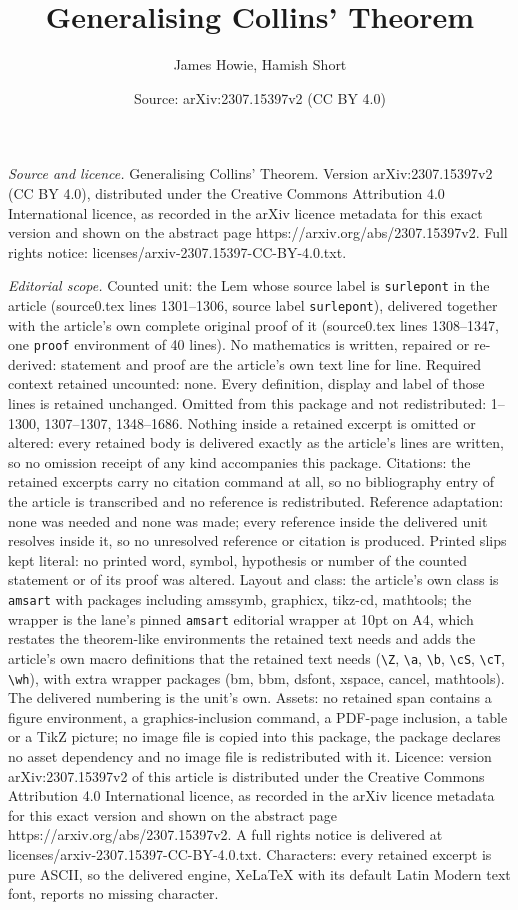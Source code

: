 \documentclass[10pt,a4paper]{amsart}
\title[Generalising Collins' Theorem]{Generalising Collins' Theorem}
\author{James Howie, Hamish Short}
\date{Source: arXiv:2307.15397v2 (CC BY 4.0)}
\begin{document}
\maketitle

\noindent\emph{Source and licence.} Generalising Collins' Theorem. Version arXiv:2307.15397v2 (CC BY 4.0), distributed under the Creative Commons Attribution 4.0 International licence, as recorded in the arXiv licence metadata for this exact version and shown on the abstract page https://arxiv.org/abs/2307.15397v2. Full rights notice: licenses/arxiv-2307.15397-CC-BY-4.0.txt.\par\smallskip

\noindent\textit{Editorial scope.} Counted unit: the Lem whose source label is \texttt{surlepont} in the article (source0.tex lines 1301--1306, source label \texttt{surlepont}), delivered together with the article's own complete original proof of it (source0.tex lines 1308--1347, one \texttt{proof} environment of 40 lines). No mathematics is written, repaired or re-derived: statement and proof are the article's own text line for line. Required context retained uncounted: none. Every definition, display and label of those lines is retained unchanged. Omitted from this package and not redistributed: 1--1300, 1307--1307, 1348--1686. Nothing inside a retained excerpt is omitted or altered: every retained body is delivered exactly as the article's lines are written, so no omission receipt of any kind accompanies this package. Citations: the retained excerpts carry no citation command at all, so no bibliography entry of the article is transcribed and no reference is redistributed. Reference adaptation: none was needed and none was made; every reference inside the delivered unit resolves inside it, so no unresolved reference or citation is produced. Printed slips kept literal: no printed word, symbol, hypothesis or number of the counted statement or of its proof was altered. Layout and class: the article's own class is \texttt{amsart} with packages including amssymb, graphicx, tikz-cd, mathtools; the wrapper is the lane's pinned \texttt{amsart} editorial wrapper at 10pt on A4, which restates the theorem-like environments the retained text needs and adds the article's own macro definitions that the retained text needs (\texttt{\textbackslash Z}, \texttt{\textbackslash a}, \texttt{\textbackslash b}, \texttt{\textbackslash cS}, \texttt{\textbackslash cT}, \texttt{\textbackslash wh}), with extra wrapper packages (bm, bbm, dsfont, xspace, cancel, mathtools). The delivered numbering is the unit's own. Assets: no retained span contains a figure environment, a graphics-inclusion command, a PDF-page inclusion, a table or a TikZ picture; no image file is copied into this package, the package declares no asset dependency and no image file is redistributed with it. Licence: version arXiv:2307.15397v2 of this article is distributed under the Creative Commons Attribution 4.0 International licence, as recorded in the arXiv licence metadata for this exact version and shown on the abstract page https://arxiv.org/abs/2307.15397v2. A full rights notice is delivered at licenses/arxiv-2307.15397-CC-BY-4.0.txt. Characters: every retained excerpt is pure ASCII, so the delivered engine, XeLaTeX with its default Latin Modern text font, reports no missing character.
\end{document}
